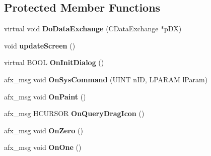 \subsection*{Protected Member Functions}
\begin{DoxyCompactItemize}
\item 
\hypertarget{class_c_calculator_command_pattern_dlg_aa0dbbf5b84427593bed2e8465f42b0a2}{}virtual void {\bfseries Do\+Data\+Exchange} (C\+Data\+Exchange $\ast$p\+D\+X)\label{class_c_calculator_command_pattern_dlg_aa0dbbf5b84427593bed2e8465f42b0a2}

\item 
\hypertarget{class_c_calculator_command_pattern_dlg_a42f3ea55ff566dc4d720ec2ecb2a44ea}{}void {\bfseries update\+Screen} ()\label{class_c_calculator_command_pattern_dlg_a42f3ea55ff566dc4d720ec2ecb2a44ea}

\item 
\hypertarget{class_c_calculator_command_pattern_dlg_a556ebe626fa262e72863204804aec32e}{}virtual B\+O\+O\+L {\bfseries On\+Init\+Dialog} ()\label{class_c_calculator_command_pattern_dlg_a556ebe626fa262e72863204804aec32e}

\item 
\hypertarget{class_c_calculator_command_pattern_dlg_ab2ceba7c81a65e3d0bfb37ca3fec9164}{}afx\+\_\+msg void {\bfseries On\+Sys\+Command} (U\+I\+N\+T n\+I\+D, L\+P\+A\+R\+A\+M l\+Param)\label{class_c_calculator_command_pattern_dlg_ab2ceba7c81a65e3d0bfb37ca3fec9164}

\item 
\hypertarget{class_c_calculator_command_pattern_dlg_ab9c724912be2dfa09adab18aba38ce0a}{}afx\+\_\+msg void {\bfseries On\+Paint} ()\label{class_c_calculator_command_pattern_dlg_ab9c724912be2dfa09adab18aba38ce0a}

\item 
\hypertarget{class_c_calculator_command_pattern_dlg_a530286723620000fc3883cd5d1ca387d}{}afx\+\_\+msg H\+C\+U\+R\+S\+O\+R {\bfseries On\+Query\+Drag\+Icon} ()\label{class_c_calculator_command_pattern_dlg_a530286723620000fc3883cd5d1ca387d}

\item 
\hypertarget{class_c_calculator_command_pattern_dlg_a62c3ae9c25d755a160e5b6b8165b42b8}{}afx\+\_\+msg void {\bfseries On\+Zero} ()\label{class_c_calculator_command_pattern_dlg_a62c3ae9c25d755a160e5b6b8165b42b8}

\item 
\hypertarget{class_c_calculator_command_pattern_dlg_a0f8a557ec87ba8c5169b4356347e2c1b}{}afx\+\_\+msg void {\bfseries On\+One} ()\label{class_c_calculator_command_pattern_dlg_a0f8a557ec87ba8c5169b4356347e2c1b}


\end{DoxyCompactItemize}
